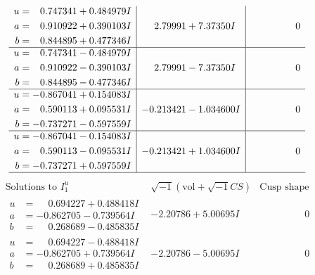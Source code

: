\documentclass[1p]{elsarticle_modified}
\theoremstyle{definition}
\newcommand{\I}{\sqrt{-1}}
\begin{document}
$$\begin{array}{c|c|c}
\begin{aligned}
u &= \phantom{-}0.747341 + 0.484979 I \\
a &= \phantom{-}0.910922 + 0.390103 I \\
b &= \phantom{-}0.844895 + 0.477346 I\end{aligned}
 & \phantom{-}2.79991 + 7.37350 I & \phantom{-0.000000 } 0 \\ \hline\begin{aligned}
u &= \phantom{-}0.747341 - 0.484979 I \\
a &= \phantom{-}0.910922 - 0.390103 I \\
b &= \phantom{-}0.844895 - 0.477346 I\end{aligned}
 & \phantom{-}2.79991 - 7.37350 I & \phantom{-0.000000 } 0 \\ \hline\begin{aligned}
u &= -0.867041 + 0.154083 I \\
a &= \phantom{-}0.590113 + 0.095531 I \\
b &= -0.737271 - 0.597559 I\end{aligned}
 & -0.213421 - 1.034600 I & \phantom{-0.000000 } 0 \\ \hline\begin{aligned}
u &= -0.867041 - 0.154083 I \\
a &= \phantom{-}0.590113 - 0.095531 I \\
b &= -0.737271 + 0.597559 I\end{aligned}
 & -0.213421 + 1.034600 I & \phantom{-0.000000 } 0\\
 \hline 
 \end{array}$$\newpage$$\begin{array}{c|c|c}  
\text{Solutions to }I^u_{1}& \I (\text{vol} + \sqrt{-1}CS) & \text{Cusp shape}\\
 \hline 
\begin{aligned}
u &= \phantom{-}0.694227 + 0.488418 I \\
a &= -0.862705 - 0.739564 I \\
b &= \phantom{-}0.268689 - 0.485835 I\end{aligned}
 & -2.20786 + 5.00695 I & \phantom{-0.000000 } 0 \\ \hline\begin{aligned}
u &= \phantom{-}0.694227 - 0.488418 I \\
a &= -0.862705 + 0.739564 I \\
b &= \phantom{-}0.268689 + 0.485835 I\end{aligned}
 & -2.20786 - 5.00695 I & \phantom{-0.000000 } 0 \\ \hline\begin{aligned}

\end{aligned}
\end{array}$$
\end{document}
